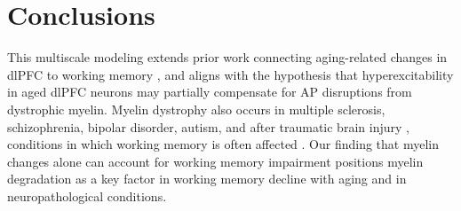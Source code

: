 \documentclass[11pt]{article}
\begin{document}
\section{Conclusions}
This multiscale modeling extends prior work connecting aging-related changes in dlPFC to working memory \cite{ibanez2020parallel,luebke2010age}, and aligns with the hypothesis that hyperexcitability in aged dlPFC neurons may partially compensate for AP disruptions from dystrophic myelin. Myelin dystrophy also occurs in multiple sclerosis, schizophrenia, bipolar disorder, autism, and after traumatic brain injury \cite{franklin2008remyelination,takahashi2011linking,armstrong2016myelin,gouvea2020brainderived,galvez2020modulation,simkins2021chronic,valdes2022schizophrenia}, conditions in which working memory is often affected \cite{wang2017deficits,hahn2018abnormalities,gold2023working}. Our finding that myelin changes alone can account for working memory impairment positions myelin degradation as a key factor in working memory decline with aging and in neuropathological conditions.



\end{document}
